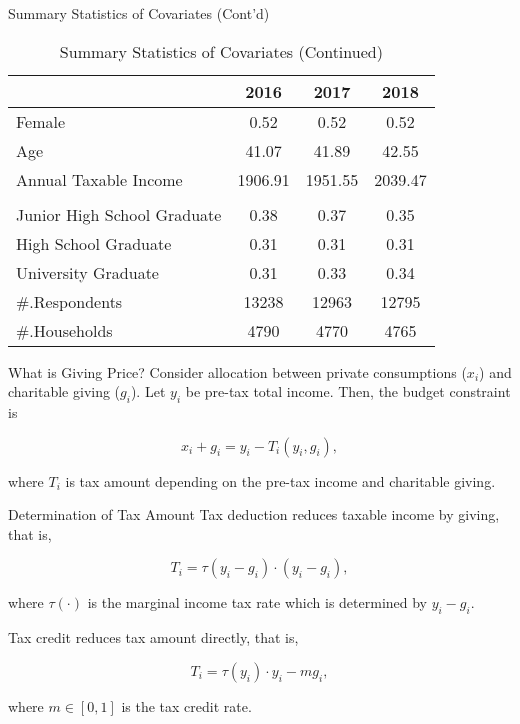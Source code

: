 \documentclass[
  ignorenonframetext,
]{beamer}
\begin{document}
\begin{frame}{Summary Statistics of Covariates (Cont'd)}
\protect\hypertarget{summary-statistics-of-covariates-contd}{}
\begin{table}

\caption{\label{tab:kableSummaryCovariate2}Summary Statistics of Covariates (Continued)}
\centering
\fontsize{9}{11}\selectfont
\begin{tabular}[t]{lccc}
\toprule
 & 2016 & 2017 & 2018\\
\midrule
Female & 0.52 & 0.52 & 0.52\\
Age & 41.07 & 41.89 & 42.55\\
Annual Taxable Income & 1906.91 & 1951.55 & 2039.47\\
\addlinespace[0.3em]
\multicolumn{4}{l}{\textbf{Education}}\\
\hspace{1em}Junior High School Graduate & 0.38 & 0.37 & 0.35\\
\hspace{1em}High School Graduate & 0.31 & 0.31 & 0.31\\
\hspace{1em}University Graduate & 0.31 & 0.33 & 0.34\\
\#.Respondents & 13238 & 12963 & 12795\\
\#.Households & 4790 & 4770 & 4765\\
\bottomrule
\end{tabular}
\end{table}
\end{frame}

\begin{frame}{What is Giving Price?}
\protect\hypertarget{what-is-giving-price}{}
Consider allocation between private consumptions (\(x_i\)) and
charitable giving (\(g_i\)). Let \(y_i\) be pre-tax total income. Then,
the budget constraint is

\[
    x_i + g_i = y_i - T_i(y_i, g_i),
\]

where \(T_i\) is tax amount depending on the pre-tax income and
charitable giving.
\end{frame}

\begin{frame}{Determination of Tax Amount}
\protect\hypertarget{determination-of-tax-amount}{}
Tax deduction reduces taxable income by giving, that is,

\[
    T_i = \tau(y_i - g_i) \cdot (y_i - g_i),
\]

where \(\tau(\cdot)\) is the marginal income tax rate which is
determined by \(y_i - g_i\).

Tax credit reduces tax amount directly, that is,

\[
    T_i = \tau(y_i)\cdot y_i - m g_i,
\]

where \(m \in [0, 1]\) is the tax credit rate.
\end{frame}
\end{document}
